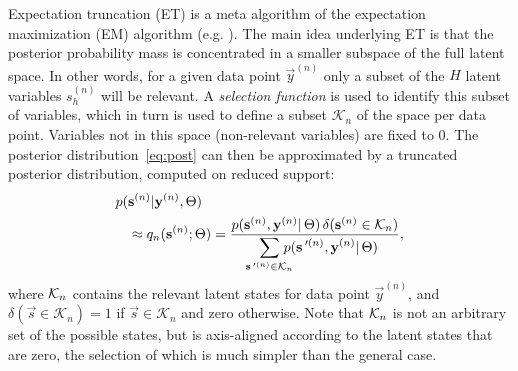 %
%

%
Expectation truncation (ET) is a meta algorithm of the expectation maximization (EM) algorithm (e.g. \citep{DempsterEtAl1977,
NealHinton1998}).
%
The main idea underlying ET is that the posterior probability mass is concentrated in a smaller subspace of the full latent space.
In other words, for a given data point $\vec{y}^{(n)}$ 
only a subset of the $H$ latent variables $s_h^{(n)}$ will be relevant.
A \textit{selection function} is used to identify this subset
of variables, which in turn is used to define a subset $\mathcal{K}_n$ of the space per data point. 
Variables not in this space (non-relevant variables) are fixed to 0.
%
The posterior distribution~\eqref{eq:post} can then be approximated by a truncated posterior distribution, computed on reduced support:
%
\vspace{-.1cm}
\begin{align}
\label{eq:sel-post}
p(&\vec{s}^{(n)}|\vec{y}^{(n)},\Theta) \nonumber\\
&\approx q_n(\vec{s}^{(n)};\Theta) = \frac{p(\vec{s}^{(n)},\vec{y}^{(n)}|\,\Theta) \,\delta(\vec{s}^{(n)}\in\hspace{-.05mm}\Kn)}
{\disS\hspace{-1.5mm}\sum_{\vec{s}\Prime^{(n)}\in\mathcal{K}_n}\hspace{-3mm} p(\vec{s}\Prime^{(n)},\vec{y}^{(n)}|\,\Theta)},
\end{align}
\normalsize
%
where $\mathcal{K}_{n}$ contains the relevant latent states for data point
$\vec{y}^{(n)}$, and $\delta(\vec{s}\in\mathcal{K}_n)=1$ if
$\vec{s}\in\mathcal{K}_n$ and zero otherwise.
Note that $\mathcal{K}_{n}$ is not an arbitrary set of the possible states, but is axis-aligned according to the latent states that are zero, the selection of which is much simpler than the general case.

